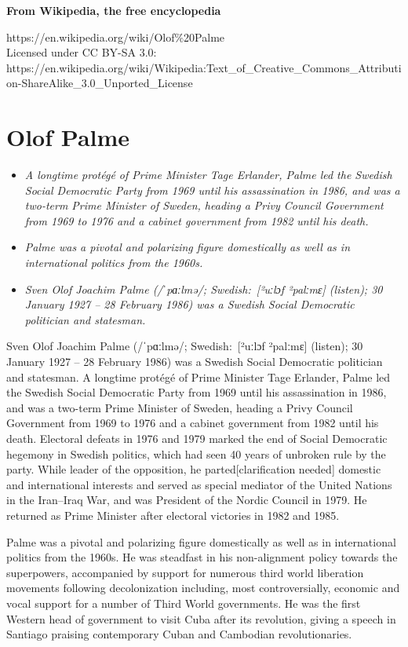 \textbf{From Wikipedia, the free encyclopedia}

https://en.wikipedia.org/wiki/Olof\%20Palme\\
Licensed under CC BY-SA 3.0:\\
https://en.wikipedia.org/wiki/Wikipedia:Text\_of\_Creative\_Commons\_Attribution-ShareAlike\_3.0\_Unported\_License

\section{Olof Palme}\label{olof-palme}

\begin{itemize}
\item
  \emph{A longtime protégé of Prime Minister Tage Erlander, Palme led
  the Swedish Social Democratic Party from 1969 until his assassination
  in 1986, and was a two-term Prime Minister of Sweden, heading a Privy
  Council Government from 1969 to 1976 and a cabinet government from
  1982 until his death.}
\item
  \emph{Palme was a pivotal and polarizing figure domestically as well
  as in international politics from the 1960s.}
\item
  \emph{Sven Olof Joachim Palme (/ˈpɑːlmə/; Swedish:~{[}²uːlɔf
  ²palːmɛ{]} (listen); 30 January 1927 -- 28 February 1986) was a
  Swedish Social Democratic politician and statesman.}
\end{itemize}

Sven Olof Joachim Palme (/ˈpɑːlmə/; Swedish:~{[}²uːlɔf ²palːmɛ{]}
(listen); 30 January 1927 -- 28 February 1986) was a Swedish Social
Democratic politician and statesman. A longtime protégé of Prime
Minister Tage Erlander, Palme led the Swedish Social Democratic Party
from 1969 until his assassination in 1986, and was a two-term Prime
Minister of Sweden, heading a Privy Council Government from 1969 to 1976
and a cabinet government from 1982 until his death. Electoral defeats in
1976 and 1979 marked the end of Social Democratic hegemony in Swedish
politics, which had seen 40 years of unbroken rule by the party. While
leader of the opposition, he parted{[}clarification needed{]} domestic
and international interests and served as special mediator of the United
Nations in the Iran--Iraq War, and was President of the Nordic Council
in 1979. He returned as Prime Minister after electoral victories in 1982
and 1985.

Palme was a pivotal and polarizing figure domestically as well as in
international politics from the 1960s. He was steadfast in his
non-alignment policy towards the superpowers, accompanied by support for
numerous third world liberation movements following decolonization
including, most controversially, economic and vocal support for a number
of Third World governments. He was the first Western head of government
to visit Cuba after its revolution, giving a speech in Santiago praising
contemporary Cuban and Cambodian revolutionaries.

